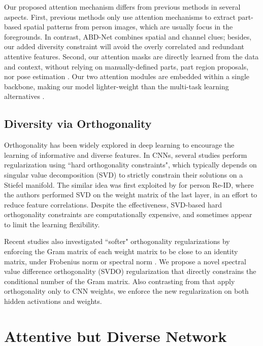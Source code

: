 \documentclass[10pt,twocolumn]{article}
\begin{document}
Our proposed attention mechanism differs from previous methods in several aspects. First, previous methods \cite{zhao2017deeply, yao2017deep, xu2018attention} only use attention mechanisms to extract part-based
spatial patterns from person images, which are usually focus in the foregrounds. In contrast, ABD-Net combines spatial and channel clues; besides, our added diversity constraint will avoid the overly correlated and redundant attentive features.
Second, our attention masks are directly learned from the data and context, without relying on manually-defined parts, part region proposals, nor pose estimation \cite{zhao2017deeply, yao2017deep, xu2018attention}. 
Our two attention modules are embedded within a single backbone, making our model lighter-weight than the multi-task learning alternatives \cite{xu2018attention,li2018harmonious}.



\subsection{Diversity via Orthogonality}
Orthogonality has been widely explored in deep learning to encourage the learning of informative and diverse features. In CNNs, several studies \cite{DBLP:journals/corr/abs-1102-1523,harandi2016generalized,ozay2016optimization,huang2017orthogonal} perform regularization using ``hard orthogonality constraints", which typically depends on singular value decomposition (SVD) to strictly constrain their solutions on a Stiefel manifold. The similar idea was first exploited by \cite{Sun_2017} for person Re-ID, where the authors performed SVD on the weight matrix of the last layer, in an effort to reduce feature correlations. Despite the effectiveness, SVD-based hard orthogonality constraints are computationally expensive, and sometimes appear to limit the learning flexibility.  


Recent studies also investigated ``softer" orthogonality regularizations by enforcing the Gram matrix of each weight matrix to be close to an identity matrix, under Frobenius norm \cite{Xie_2017} or spectral norm \cite{bansal2018can}. We propose a novel spectral value difference orthogonality (SVDO) regularization that directly constrains the conditional number of the Gram matrix. Also contrasting from \cite{Sun_2017,Xie_2017} that apply orthogonality only to CNN weights, we enforce the new regularization on both hidden activations and weights. 


\section{Attentive but Diverse Network} \label{sec:method}
\end{document}
